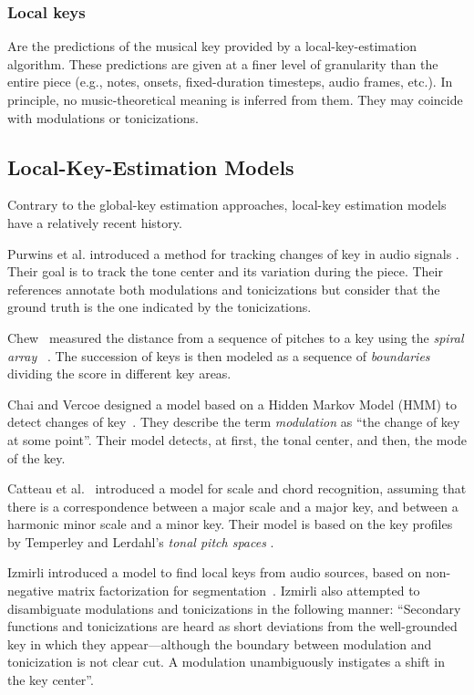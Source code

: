 \documentclass[sigconf]{acmart}
\begin{document}
\subsubsection{Local keys}
Are the predictions of the musical key provided by a local-key-estimation algorithm. 
These predictions are given at a finer level of granularity than the entire piece (e.g., notes, onsets, fixed-duration timesteps, audio frames, etc.).
In principle, no music-theoretical meaning is inferred from them. They may coincide with modulations or tonicizations.

\subsection{Local-Key-Estimation Models}\label{ssec:localkey}

Contrary to the global-key estimation approaches, local-key estimation models have a relatively recent history.

Purwins et al. introduced a method for tracking changes of key in audio signals %
\cite{purwins_new_2000}. 
Their goal is to track the tone center and its variation during the piece. Their references annotate both modulations and tonicizations but consider that the ground truth is the one indicated by the tonicizations.

Chew~\cite{chew2002key} measured the distance from a sequence of pitches to a key using the \emph{spiral array} ~\cite{Chew2000TowardsAM}. 
The succession of keys is then modeled as a sequence of \emph{boundaries} dividing the score in different key areas.

Chai and Vercoe designed a model based on a Hidden Markov Model (HMM) to detect changes of key~\cite{chai_detection_2005}. 
They describe the term \emph{modulation} as ``the change of key at some point''. 
Their model detects, at first, the tonal center, and then, the mode of the key.

Catteau et al.~\cite{Catteau07tonalkey} introduced a model for scale and chord recognition, assuming that there is a correspondence between a major scale and a major key, and between a harmonic minor scale and a minor key. Their model is based on the key profiles by Temperley \cite{Temperley99:tonality} and Lerdahl's \emph{tonal pitch spaces} \cite{lerdahl88tps}.

Izmirli introduced a model to find local keys from audio sources, based on non-negative matrix factorization for segmentation~\cite{izmirli_localized_2007}. 
Izmirli also attempted to disambiguate modulations and tonicizations in the following manner: ``Secondary functions and tonicizations are heard as short deviations from the well-grounded key in which they appear---although the boundary between modulation and tonicization is not clear cut. A modulation unambiguously instigates a shift in the key center''. 
\end{document}
